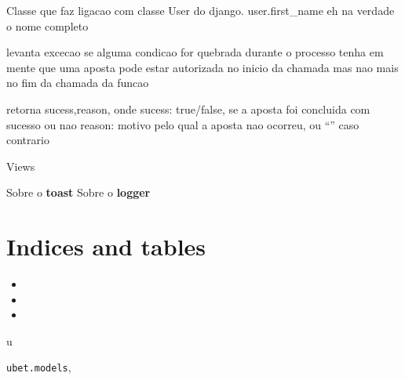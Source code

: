 \documentclass[letterpaper,10pt,english]{sphinxmanual}
\begin{document}

\begin{fulllineitems}
\label{modules/models:ubet.models.Ubet_user}
Classe que faz ligacao com classe User do django. 
user.first\_name eh na verdade o nome completo

\begin{fulllineitems}
\label{modules/models:ubet.models.Ubet_user.bet}
levanta excecao se alguma condicao for quebrada durante o processo
tenha em mente que uma aposta pode estar autorizada no inicio da chamada mas
nao mais no fim da chamada da funcao

retorna sucess,reason, onde
sucess: true/false, se a aposta foi concluida com sucesso ou nao
reason: motivo pelo qual a aposta nao ocorreu, ou ``'' caso contrario

\end{fulllineitems}


\end{fulllineitems}


Views

Sobre o \textbf{toast}
Sobre o \textbf{logger}


\chapter{Indices and tables}
\label{index:indices-and-tables}\label{index::doc}\begin{itemize}
\item {} 

\item {} 

\item {} 

\end{itemize}


\renewcommand{\indexname}{Python Module Index}
\begin{theindex}
\def\bigletter#1{{\Large\sffamily#1}\nopagebreak\vspace{1mm}}
\bigletter{u}
\item {\texttt{ubet.models}}, \pageref{modules/models:module-ubet.models}
\end{theindex}

\renewcommand{\indexname}{Index}
\printindex
\end{document}
